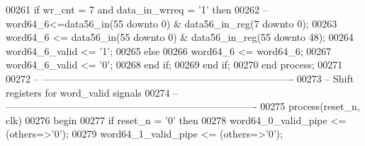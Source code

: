 \begin{DoxyCode}
00261       \textcolor{keywordflow}{if} \textcolor{vhdlchar}{wr_cnt} \textcolor{vhdlchar}{=} \textcolor{vhdllogic}{}\textcolor{vhdllogic}{7} \textcolor{keywordflow}{and} \textcolor{vhdlchar}{data_in_wrreq} \textcolor{vhdlchar}{=} \textcolor{vhdlchar}{'}\textcolor{vhdllogic}{}\textcolor{vhdllogic}{1}\textcolor{vhdlchar}{'} \textcolor{keywordflow}{then}
00262 \textcolor{keyword}{         --word64\_6<=data56\_in(55 downto 0) & data56\_in\_reg(7 downto 0);}
00263          \textcolor{vhdlchar}{word64_6} \textcolor{vhdlchar}{<=}  \textcolor{vhdlchar}{data56_in}\textcolor{vhdlchar}{(}\textcolor{vhdllogic}{}\textcolor{vhdllogic}{55} \textcolor{keywordflow}{downto} \textcolor{vhdllogic}{}\textcolor{vhdllogic}{0}\textcolor{vhdlchar}{)} \textcolor{vhdlchar}{&} \textcolor{vhdlchar}{data56_in_reg}\textcolor{vhdlchar}{(}\textcolor{vhdllogic}{}\textcolor{vhdllogic}{55} \textcolor{keywordflow}{downto} \textcolor{vhdllogic}{}\textcolor{vhdllogic}{48}\textcolor{vhdlchar}{)};
00264          \textcolor{vhdlchar}{word64_6_valid} \textcolor{vhdlchar}{<=} \textcolor{vhdlchar}{'}\textcolor{vhdllogic}{}\textcolor{vhdllogic}{1}\textcolor{vhdlchar}{'};
00265       \textcolor{keywordflow}{else} 
00266          \textcolor{vhdlchar}{word64_6} \textcolor{vhdlchar}{<=} \textcolor{vhdlchar}{word64_6};
00267          \textcolor{vhdlchar}{word64_6_valid} \textcolor{vhdlchar}{<=} \textcolor{vhdlchar}{'}\textcolor{vhdllogic}{}\textcolor{vhdllogic}{0}\textcolor{vhdlchar}{'};
00268       \textcolor{keywordflow}{end} \textcolor{keywordflow}{if};
00269    \textcolor{keywordflow}{end} \textcolor{keywordflow}{if};
00270 \textcolor{keywordflow}{end} \textcolor{keywordflow}{process};
00271     
00272 \textcolor{keyword}{-- ----------------------------------------------------------------------------}
00273 \textcolor{keyword}{-- Shift registers for word\_valid signals }
00274 \textcolor{keyword}{-- ---------------------------------------------------------------------------- }
00275 \textcolor{keywordflow}{process}(reset_n, clk)
00276 \textcolor{vhdlkeyword}{begin}
00277    \textcolor{keywordflow}{if} \textcolor{vhdlchar}{reset_n} \textcolor{vhdlchar}{=} \textcolor{vhdlchar}{'}\textcolor{vhdllogic}{}\textcolor{vhdllogic}{0}\textcolor{vhdlchar}{'} \textcolor{keywordflow}{then}
00278       \textcolor{vhdlchar}{word64_0_valid_pipe} \textcolor{vhdlchar}{<=} \textcolor{vhdlchar}{(}\textcolor{keywordflow}{others}\textcolor{vhdlchar}{=}\textcolor{vhdlchar}{>}\textcolor{vhdlchar}{'}\textcolor{vhdllogic}{}\textcolor{vhdllogic}{0}\textcolor{vhdlchar}{'}\textcolor{vhdlchar}{)};
00279       \textcolor{vhdlchar}{word64_1_valid_pipe} \textcolor{vhdlchar}{<=} \textcolor{vhdlchar}{(}\textcolor{keywordflow}{others}\textcolor{vhdlchar}{=}\textcolor{vhdlchar}{>}\textcolor{vhdlchar}{'}\textcolor{vhdllogic}{}\textcolor{vhdllogic}{0}\textcolor{vhdlchar}{'}\textcolor{vhdlchar}{)};

\end{DoxyCode}
